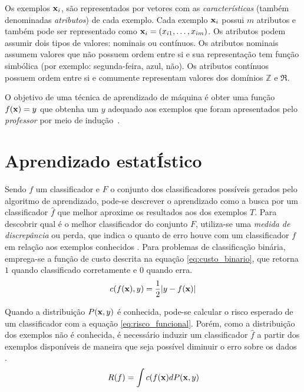 Os exemplos $\mathbf{x}_i$, são representados por vetores com as \emph{características} (também denominadas \emph{atributos}) de cada exemplo. Cada exemplo $\mathbf{x}_i$ possui $m$ atributos e também pode ser representado como $\mathbf{x}_i = (x_{i1},\dotsc,x_{im})$. Os atributos podem assumir dois tipos de valores: nominais ou contínuos. Os atributos nominais assumem valores que não possuem ordem entre si e sua representação tem função simbólica (por exemplo: segunda-feira, azul, não). Os atributos contínuos possuem ordem entre si e comumente representam valores dos domínios $\mathbb{Z}$ e $\Re$.

O objetivo de uma técnica de aprendizado de máquina é obter uma função $f(\mathbf{x}) = y$ que obtenha um $y$ adequado aos exemplos que foram apresentados pelo \emph{professor} por meio de indução~\cite{osuna1997support}.


\section{Aprendizado estatÍstico}\label{sec:aprendizado}

Sendo $f$ um classificador e $F$ o conjunto dos classificadores possíveis gerados pelo algoritmo de aprendizado, pode-se descrever o aprendizado como a busca por um classificador $\hat{f}$ que melhor aproxime os resultados aos dos exemplos $T$. Para descobrir qual é o melhor classificador do conjunto $F$, utiliza-se uma \emph{medida de discrepância} ou perda, que indica o quanto de erro houve com um classificador $f$ em relação aos exemplos conhecidos \cite{vapnik1998statistical}. Para problemas de classificação binária, emprega-se a função de custo descrita na equação \ref{eq:custo_binario}, que retorna $1$ quando classificado corretamente e $0$ quando erra.
\begin{equation}\label{eq:custo_binario}
  c(f(\mathbf{x}), y) = \frac{1}{2} | y - f(\mathbf{x})|
\end{equation}

Quando a distribuição $P(\mathbf{x},y)$ é conhecida, pode-se calcular o risco esperado de um classificador com a equação \ref{eq:risco_funcional}. Porém, como a distribuição dos exemplos não é conhecida, é necessário induzir um classificador $\hat{f}$ a partir dos exemplos disponíveis de maneira que seja possível diminuir o erro sobre os dados \cite{scholkopf2002learning}. 
\begin{equation}\label{eq:risco_funcional}
  R(f) = \int{ c(f(\mathbf{x})dP(\mathbf{x}, y) }
\end{equation}

